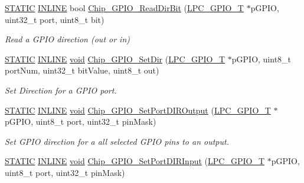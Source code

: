 \begin{DoxyCompactItemize}
\hyperlink{group__LPC__Types__Public__Macros_ga10b2d890d871e1489bb02b7e70d9bdfb}{S\-T\-A\-T\-I\-C} \hyperlink{group__LPC__Types__Public__Types_ga2eb6f9e0395b47b8d5e3eeae4fe0c116}{I\-N\-L\-I\-N\-E} bool \hyperlink{group__GPIO__17XX__40XX_ga8f436d49d7737db583aa4e71bc21937b}{Chip\-\_\-\-G\-P\-I\-O\-\_\-\-Read\-Dir\-Bit} (\hyperlink{structLPC__GPIO__T}{L\-P\-C\-\_\-\-G\-P\-I\-O\-\_\-\-T} $\ast$p\-G\-P\-I\-O, uint32\-\_\-t port, uint8\-\_\-t bit)
\begin{DoxyCompactList}\small\item\em Read a G\-P\-I\-O direction (out or in) \end{DoxyCompactList}\item 
\hyperlink{group__LPC__Types__Public__Macros_ga10b2d890d871e1489bb02b7e70d9bdfb}{S\-T\-A\-T\-I\-C} \hyperlink{group__LPC__Types__Public__Types_ga2eb6f9e0395b47b8d5e3eeae4fe0c116}{I\-N\-L\-I\-N\-E} \hyperlink{Paradigm_2Tern__EE_2small_2portmacro_8h_a14d32f8130d3c0b212cfc751730b5b49}{void} \hyperlink{group__GPIO__17XX__40XX_gacc2acb3d50b47954b25ef0ac439993d8}{Chip\-\_\-\-G\-P\-I\-O\-\_\-\-Set\-Dir} (\hyperlink{structLPC__GPIO__T}{L\-P\-C\-\_\-\-G\-P\-I\-O\-\_\-\-T} $\ast$p\-G\-P\-I\-O, uint8\-\_\-t port\-Num, uint32\-\_\-t bit\-Value, uint8\-\_\-t out)
\begin{DoxyCompactList}\small\item\em Set Direction for a G\-P\-I\-O port. \end{DoxyCompactList}\item 
\hyperlink{group__LPC__Types__Public__Macros_ga10b2d890d871e1489bb02b7e70d9bdfb}{S\-T\-A\-T\-I\-C} \hyperlink{group__LPC__Types__Public__Types_ga2eb6f9e0395b47b8d5e3eeae4fe0c116}{I\-N\-L\-I\-N\-E} \hyperlink{Paradigm_2Tern__EE_2small_2portmacro_8h_a14d32f8130d3c0b212cfc751730b5b49}{void} \hyperlink{group__GPIO__17XX__40XX_gaeeb23db039b2bf56ed96a9d6112fab69}{Chip\-\_\-\-G\-P\-I\-O\-\_\-\-Set\-Port\-D\-I\-R\-Output} (\hyperlink{structLPC__GPIO__T}{L\-P\-C\-\_\-\-G\-P\-I\-O\-\_\-\-T} $\ast$p\-G\-P\-I\-O, uint8\-\_\-t port, uint32\-\_\-t pin\-Mask)
\begin{DoxyCompactList}\small\item\em Set G\-P\-I\-O direction for a all selected G\-P\-I\-O pins to an output. \end{DoxyCompactList}\item 
\hyperlink{group__LPC__Types__Public__Macros_ga10b2d890d871e1489bb02b7e70d9bdfb}{S\-T\-A\-T\-I\-C} \hyperlink{group__LPC__Types__Public__Types_ga2eb6f9e0395b47b8d5e3eeae4fe0c116}{I\-N\-L\-I\-N\-E} \hyperlink{Paradigm_2Tern__EE_2small_2portmacro_8h_a14d32f8130d3c0b212cfc751730b5b49}{void} \hyperlink{group__GPIO__17XX__40XX_ga09e433572db2ec8a3e30e508ee5bcbd0}{Chip\-\_\-\-G\-P\-I\-O\-\_\-\-Set\-Port\-D\-I\-R\-Input} (\hyperlink{structLPC__GPIO__T}{L\-P\-C\-\_\-\-G\-P\-I\-O\-\_\-\-T} $\ast$p\-G\-P\-I\-O, uint8\-\_\-t port, uint32\-\_\-t pin\-Mask)

\end{DoxyCompactItemize}
